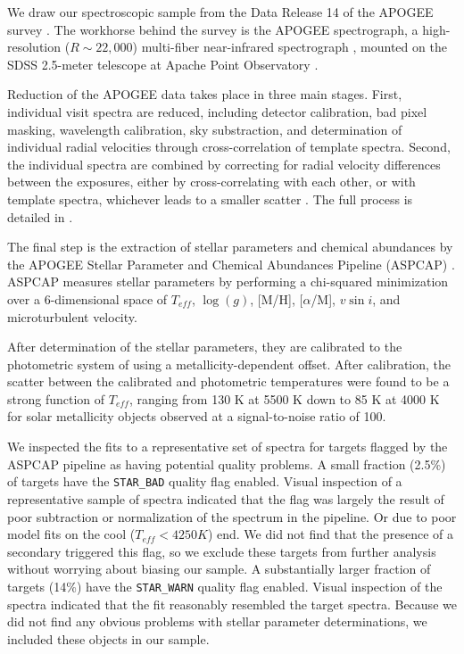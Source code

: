 \documentclass[manuscript]{aastex6}
\newcommand{\vsini}{\ensuremath{v \sin i}}
\newcommand{\Teff}{\ensuremath{T_{eff}}}
\newcommand{\logg}{\ensuremath{\log(g)}}
\newcommand{\STARBAD}{\texttt{STAR\_BAD}}
\newcommand{\STARWARN}{\texttt{STAR\_WARN}}
\begin{document}
We draw our spectroscopic sample from the Data Release 14 \citep{Abolfathi18}
of the APOGEE survey \citep{Majewski17}. The workhorse behind the survey is the
APOGEE spectrograph, a high-resolution (\(R \sim 22,000\)) multi-fiber
near-infrared spectrograph \citep{Wilson10}, mounted on the SDSS 2.5-meter
telescope at Apache Point Observatory \citep{Gunn06}.

Reduction of the APOGEE data takes place in three main stages. First,
individual visit spectra are reduced, including detector calibration, bad pixel
masking, wavelength calibration, sky substraction, and determination of
individual radial velocities through cross-correlation of template spectra.
Second, the individual spectra are combined by correcting for radial velocity
differences between the exposures, either by cross-correlating with each other,
or with template spectra, whichever leads to a smaller scatter
\citep{Holtzman18}. The full process is detailed in \citet{Nidever15}.

The final step is the extraction of stellar parameters and chemical abundances
by the APOGEE Stellar Parameter and Chemical Abundances Pipeline (ASPCAP)
\citep{GarciaPerez16}. ASPCAP measures stellar parameters by performing a
chi-squared minimization \citep{AllendePrieto06} over a 6-dimensional space of
\Teff, \logg, [M/H], [\(\alpha\)/M], \vsini, and microturbulent velocity.

After determination of the stellar parameters, they are calibrated to the
photometric system of \citet{GonzalezHernandez09} using a metallicity-dependent
offset. After calibration, the scatter between the calibrated and photometric
temperatures  were found to be a strong function of \Teff{}, ranging from 130 
K at 5500 K down to 85 K at 4000 K \citep{Holtzman18} for solar
metallicity objects observed at a signal-to-noise ratio of 100. 

We inspected the fits to a representative set of spectra for targets flagged 
by the ASPCAP pipeline as having potential quality problems. A small fraction
(2.5\%) of targets have the \STARBAD{} quality flag enabled. Visual inspection
of a representative sample of spectra indicated that the flag was largely the
result of poor subtraction or normalization of the spectrum in the pipeline. Or
due to poor model fits on the cool (\(\Teff < 4250 K\)) end. We did not find
that the presence of a secondary triggered this flag, so we exclude these
targets from further analysis without worrying about biasing our sample. A 
substantially larger fraction of targets (14\%) have the \STARWARN{} quality 
flag enabled. Visual inspection of the spectra indicated that the fit 
reasonably resembled the target spectra. Because we did not find any obvious 
problems with stellar parameter determinations, we included these objects in 
our sample.
\end{document}
